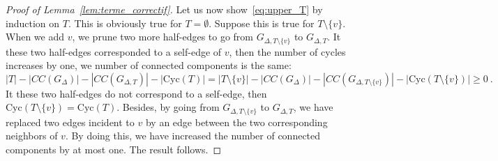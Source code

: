 \documentclass[10pt,a4paper]{amsart}
\begin{document}
\begin{proof}[Proof of Lemma~\ref{lem:terme_correctif}]
    Let us now show~\eqref{eq:upper_T}  by induction on $T$. This is obviously true for $T=\emptyset$. Suppose this is true for $T\setminus\{v\}$. When we add $v$, we prune two more half-edges to go from $G_{\Delta,T\setminus \{v\}}$ to $G_{\Delta,T}$. It these two half-edges corresponded to a self-edge of $v$, then the number of cycles increases by one, we number of connected components is the same:  
    \[
    |T|- |CC(G_{\Delta})| -|CC(G_{\Delta,T})|- |\mathrm{Cyc}(T)| = |T\setminus\{v\}|- |CC(G_{\Delta})| -|CC(G_{\Delta,T\setminus\{v\}})|- |\mathrm{Cyc}(T\setminus\{v\})| \geq 0\ . 
    \]
    It these two half-edges do not correspond to a self-edge, then $\mathrm{Cyc}(T\setminus\{v\})= \mathrm{Cyc}(T)$. Besides, by going from $G_{\Delta,T\setminus\{v\}}$ to $G_{\Delta,T}$, we have replaced two edges incident to $v$ by an edge between the two corresponding neighbors of $v$. By doing this, we have increased the number of connected components by at most one. The result follows. 
    
\end{proof}    
\end{document}
